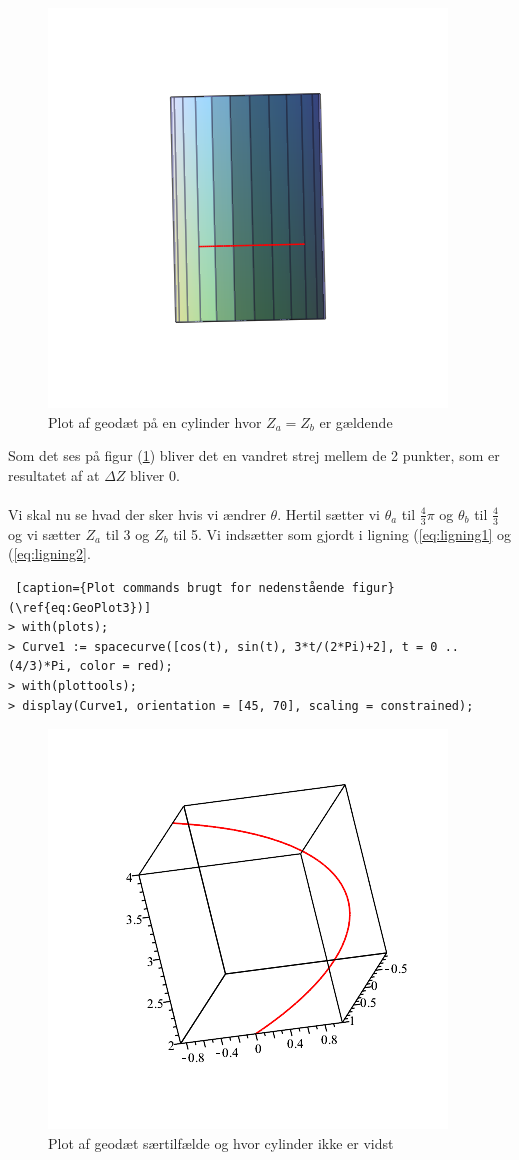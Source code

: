\begin{figure}[ht]
\center
\includegraphics[scale=0.4]{pictures/Opg8_Figur2.png}
\caption{Plot af geodæt på en cylinder hvor $Z_a=Z_b$ er gældende}
\label{eq:GeoPlot2}
\end{figure}
Som det ses på figur (\ref{eq:GeoPlot2}) bliver det en vandret strej mellem de 2 punkter, som er resultatet af at $\Delta Z$ bliver 0.
\\
\\
Vi skal nu se hvad der sker hvis vi ændrer $\theta$. Hertil sætter vi $\theta_a$ til $\frac{4}{3} \pi$ og $\theta_b$ til $\frac{4}{3}$ og vi sætter $Z_a$ til 3 og $Z_b$ til 5. Vi indsætter som gjordt i ligning (\ref{eq:ligning1} og (\ref{eq:ligning2}.
\begin{lstlisting} [caption={Plot commands brugt for nedenstående figur}(\ref{eq:GeoPlot3})]
> with(plots);
> Curve1 := spacecurve([cos(t), sin(t), 3*t/(2*Pi)+2], t = 0 .. (4/3)*Pi, color = red);
> with(plottools);
> display(Curve1, orientation = [45, 70], scaling = constrained);
\end{lstlisting}
\begin{figure}[ht] 
\center
\includegraphics[scale=0.4]{pictures/Opg8_Figur3.png}
\caption{Plot af geodæt særtilfælde og hvor cylinder ikke er vidst}
\label{eq:GeoPlot3}
\end{figure}
